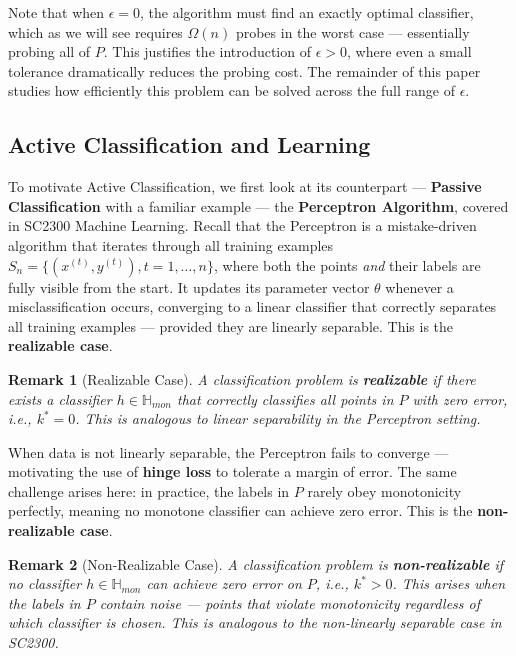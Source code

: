 \documentclass[11pt, a4paper]{article}
\theoremstyle{boxed}
\newtheorem{innerremark}{Remark}[section]
\newenvironment{remark}
  {\begin{mdframed}[style=notestyle]\begin{innerremark}}
  {\end{innerremark}\end{mdframed}}
\begin{document}
Note that when $\epsilon = 0$, the algorithm must find an exactly optimal classifier, which as we will see requires $\Omega(n)$ probes in the worst case --- essentially probing all of $P$. This justifies the introduction of $\epsilon > 0$, where even a small tolerance dramatically reduces the probing cost. The remainder of this paper studies how efficiently this problem can be solved across the full range of $\epsilon$.

\subsection{Active Classification and Learning}
To motivate Active Classification, we first look at its counterpart --- \textbf{Passive Classification} with a familiar example --- the \textbf{Perceptron Algorithm}, covered in SC2300 Machine Learning. Recall that the Perceptron is a mistake-driven algorithm that iterates through all training examples $S_n = \{(x^{(t)}, y^{(t)}), t = 1, \ldots, n\}$, where both the points \textit{and} their labels are fully visible from the start. It updates its parameter vector $\theta$ whenever a misclassification occurs, converging to a linear classifier that correctly separates all training examples --- provided they are linearly separable. This is the \textbf{realizable case}.

\begin{remark}[Realizable Case]
A classification problem is \textbf{realizable} if there exists a classifier $h \in \mathbb{H}_{mon}$ that correctly classifies all points in $P$ with zero error, i.e., $k^* = 0$. This is analogous to linear separability in the Perceptron setting.
\end{remark}

When data is not linearly separable, the Perceptron fails to converge --- motivating the use of \textbf{hinge loss} to tolerate a margin of error. The same challenge arises here: in practice, the labels in $P$ rarely obey monotonicity perfectly, meaning no monotone classifier can achieve zero error. This is the \textbf{non-realizable case}.

\begin{remark}[Non-Realizable Case]
A classification problem is \textbf{non-realizable} if no classifier $h \in \mathbb{H}_{mon}$ can achieve zero error on $P$, i.e., $k^* > 0$. This arises when the labels in $P$ contain noise --- points that violate monotonicity regardless of which classifier is chosen. This is analogous to the non-linearly separable case in SC2300.
\end{remark}
\end{document}
